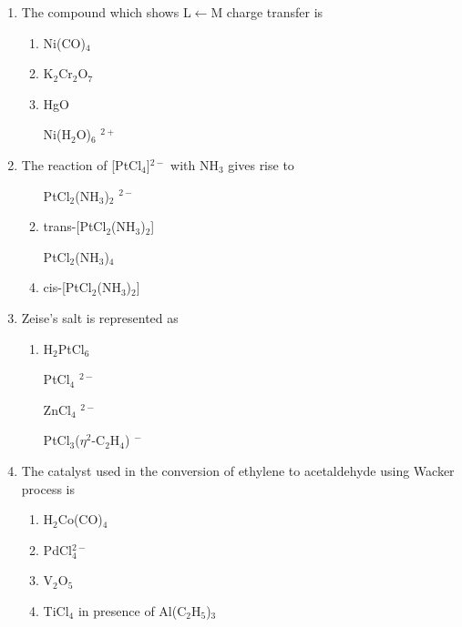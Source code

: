 \documentclass[journal,12pt,onecolumn]{IEEEtran}
\theoremstyle{remark}
\begin{document}
\begin{enumerate}
\item The compound which shows L$\leftarrow$M charge transfer is  \hfill{}

\begin{multicols}{2}
\begin{enumerate} 
\item Ni(CO)$_4$  
\item K$_2$Cr$_2$O$_7$  
\item HgO  
 \item   [Ni(H$_2$O)$_6$]$^{2+}$  
\end{enumerate}
\end{multicols}
  

\item The reaction of [PtCl$_4$]$^{2-}$ with NH$_3$ gives rise to  \hfill{}

\begin{multicols}{2}
\begin{enumerate} 
 \item   [PtCl$_2$(NH$_3$)$_2$]$^{2-}$  
 \item   trans-[PtCl$_2$(NH$_3$)$_2$]  
 \item   [PtCl$_2$(NH$_3$)$_4$]  
 \item   cis-[PtCl$_2$(NH$_3$)$_2$]  
\end{enumerate}
\end{multicols}
  

\item  Zeise's salt is represented as  \hfill{}

\begin{multicols}{2}
\begin{enumerate} 
 \item   H$_2$PtCl$_6$  
 \item   [PtCl$_4$]$^{2-}$  
 \item   [ZnCl$_4$]$^{2-}$  
 \item   [PtCl$_3$($\eta^2$-C$_2$H$_4$)]$^{-}$  
\end{enumerate}
\end{multicols}
  

\item  The catalyst used in the conversion of ethylene to acetaldehyde using Wacker process is  \hfill{}

\begin{multicols}{2}
\begin{enumerate} 
\item H$_2$Co(CO)$_4$  
\item PdCl$_4^{2-}$  
\item V$_2$O$_5$  
\item TiCl$_4$ in presence of Al(C$_2$H$_5$)$_3$  
\end{enumerate}
\end{multicols}
  


\end{enumerate}
\end{document}
